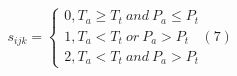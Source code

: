 \documentclass[12pt]{article}
\begin{document}
$$
s_{ijk} = 
\begin{cases}
0, T_{a} \geq T_{t} \ and \ P_{a} \leq P_{t} \\
1, T_{a} < T_{t} \ or \ P_{a} > P_{t} \ \ \ \ (7) \\ 
2, T_{a} < T_{t} \ and  \ P_{a} > P_{t}
\end{cases}
$$
\end{document}
